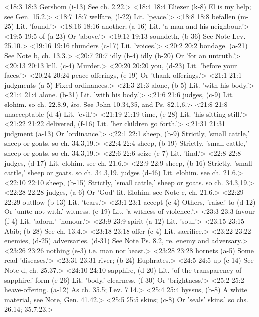 <18:3 18:3  Gershom (i-13)  See ch. 2.22.>
<18:4 18:4  Eliezer (k-8)  El is my help; see Gen. 15.2.>
<18:7 18:7  welfare, (l-22)  Lit. 'peace.'>
<18:8 18:8  befallen (m-25)  Lit. 'found.'>
<18:16 18:16  another; (a-16)  Lit. 'a man and his neighbour.'>
<19:5 19:5  of (a-23)  Or 'above.'>
<19:13 19:13  soundeth, (b-36)  See Note Lev. 25.10.>
<19:16 19:16  thunders (c-17)  Lit. 'voices.'>
<20:2 20:2  bondage. (a-21)  See Note b, ch. 13.3.>
<20:7 20:7  idly (b-4)  idly (b-20)
  Or 'for an untruth.'>
<20:13 20:13  kill. (c-4)  Murder.>
<20:20 20:20  you, (d-23)  Lit. 'before your faces.'>
<20:24 20:24  peace-offerings, (e-19)  Or 'thank-offerings.'>
<21:1 21:1  judgments (a-5)  Fixed ordinances.>
<21:3 21:3  alone, (b-5) Lit. 'with his body.'>
<21:4 21:4  alone. (b-31)  Lit. 'with his body.'>
<21:6 21:6  judges, (c-9)  Lit. elohim. so ch. 22.8,9, &c. See John 10.34,35, and Ps.  82.1,6.>
<21:8 21:8  unacceptable (d-4)  Lit. 'evil.'>
<21:19 21:19  time, (e-28)  Lit. 'his sitting still.'>
<21:22 21:22  delivered, (f-16)  Lit. 'her children go forth.'>
<21:31 21:31  judgment (a-13)  Or 'ordinance.'>
<22:1 22:1  sheep, (b-9) Strictly, 'small cattle,' sheep or goats. so ch. 34.3,19.>
<22:4 22:4  sheep, (b-19) Strictly, 'small cattle,' sheep or goats. so ch. 34.3,19.>
<22:6 22:6  seize (c-7)  Lit. 'find.'>
<22:8 22:8  judges, (d-17) Lit. elohim. see ch. 21.6.>
<22:9 22:9  sheep, (b-16) Strictly, 'small cattle,' sheep or goats. so ch. 34.3,19.
  judges (d-46)  Lit. elohim. see ch. 21.6.>
<22:10 22:10  sheep, (b-15)  Strictly, 'small cattle,' sheep or goats. so ch. 34.3,19.>
<22:28 22:28  judges, (a-6)  Or 'God' lit. Elohim. see Note c, ch. 21.6.>
<22:29 22:29  outflow (b-13)  Lit. 'tears.'>
<23:1 23:1  accept (c-4)  Others, 'raise.'
  to (d-12)  Or 'unite not with.'
  witness. (e-19)  Lit. 'a witness of violence.'>
<23:3 23:3  favour (f-4)  Lit. 'adorn,' 'honour.'>
<23:9 23:9  spirit (a-12)  Lit. 'soul.'>
<23:15 23:15  Abib; (b-28)  See ch. 13.4.>
<23:18 23:18  offer (c-4)  Lit. sacrifice.>
<23:22 23:22  enemies, (d-25)  adversaries. (d-31)
  See Note Ps. 8.2, re. enemy and adversary.>
<23:26 23:26  nothing (e-3)  i.e. man nor beast.>
<23:28 23:28  hornets (a-5)  Some read 'diseases.'>
<23:31 23:31  river; (b-24)  Euphrates.>
<24:5 24:5  up (c-14)  See Note d, ch. 25.37.>
<24:10 24:10  sapphire, (d-20)  Lit. 'of the transparency of sapphire.'
  form (e-26)  Lit. 'body.'
  clearness. (f-30)  Or 'brightness.'>
<25:2 25:2  heave-offering. (a-12)  As ch. 35.5; Lev. 7.14.>
<25:4 25:4  byssus, (b-8)  A white material, see Note, Gen. 41.42.>
<25:5 25:5  skins; (c-8)  Or 'seals' skins.' so chs. 26.14; 35.7,23.>

